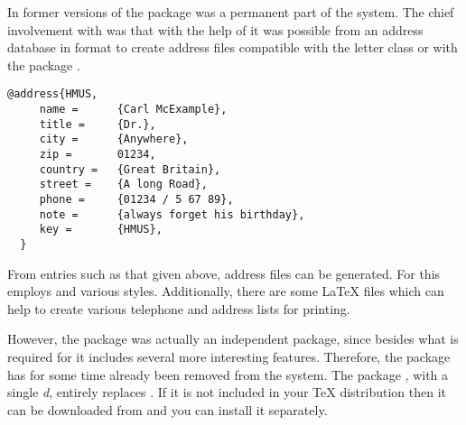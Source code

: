 In former versions of {\KOMAScript} the package  was
a permanent part of the {\KOMAScript} system.  The chief involvement
with {\KOMAScript} was that with the help of  it was
possible from an address database in {\BibTeX} format to create
address files compatible with the {\KOMAScript} letter class or with
the package .

\begin{lstlisting}[morekeywords={@address}]
  @address{HMUS,
     name =      {Carl McExample},
     title =     {Dr.},
     city =      {Anywhere},
     zip =       01234,
     country =   {Great Britain},
     street =    {A long Road},
     phone =     {01234 / 5 67 89},
     note =      {always forget his birthday},
     key =       {HMUS},
  }
\end{lstlisting}

From entries such as that given above, address files can be generated.
For this  employs {\BibTeX} and various {\BibTeX}
styles.  Additionally, there are some {\LaTeX} files which can help to
create various telephone and address lists for printing.

However, the package  was actually an independent
package, since besides what is required for {\KOMAScript} it includes
several more interesting features.  Therefore, the package
 has for some time already been removed from the
{\KOMAScript} system. The package , with a single
\emph{d}, entirely replaces .  If it is not included
in your {\TeX} distribution then it can be downloaded from
\cite{package:adrconv} and you can install it separately.

